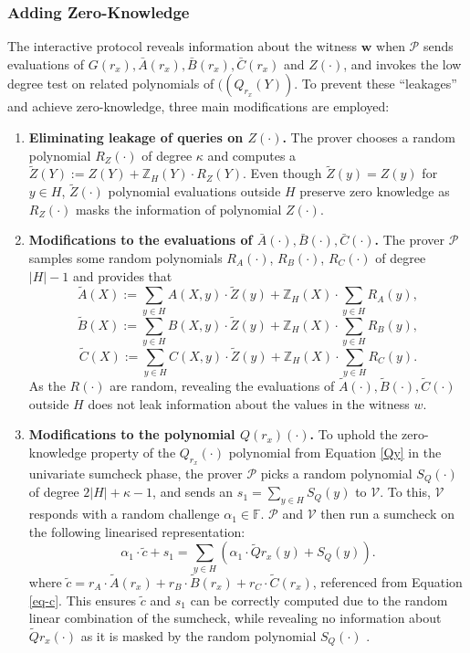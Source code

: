 \subsubsection{Adding Zero-Knowledge}\label{zkpolaris}
The interactive protocol reveals information about the witness $\textbf{w}$ when $\mathcal{P}$ sends evaluations of $G(r_x), \bar{A}(r_x), \bar{B}(r_x), \bar{C}(r_x)$ and $Z(\cdot)$, and invokes the low degree test on related polynomials of $((Q_{r_x}(Y))$. To prevent these ``leakages'' and achieve zero-knowledge, three main modifications are employed:
\begin{enumerate}
	\item \textbf{Eliminating leakage of queries on $Z(\cdot)$.} The prover chooses a random polynomial $R_Z(\cdot)$ of degree $\kappa$ and computes a $\widetilde{Z}(Y):= Z(Y)+\mathbb{Z}_{H}(Y)\cdot R_Z(Y)$. Even though $\widetilde{Z}(y)=Z(y)$ for $y\in H$, $\widetilde{Z}(\cdot)$ polynomial evaluations outside $H$ preserve zero knowledge as $R_Z(\cdot)$ masks the information of polynomial $Z(\cdot)$. 
	\item \textbf{Modifications to the evaluations of $\bar{A}(\cdot), \bar{B}(\cdot), \bar{C}(\cdot)$.} The prover $\mathcal{P}$ samples some random polynomials $R_A(\cdot)$, $R_B(\cdot)$, $R_C(\cdot)$ of degree $|H|-1$ and provides that
	$$\widetilde{A}(X)  := \sum_{y\in H}A(X,y)\cdot\widetilde{Z}(y)+\mathbb{Z}_{H}(X)\cdot\sum_{y\in H}R_A(y),$$
	$$\widetilde{B}(X)  := \sum_{y\in H}B(X,y)\cdot\widetilde{Z}(y)+\mathbb{Z}_{H}(X)\cdot\sum_{y\in H}R_B(y),$$
	$$\widetilde{C}(X)  := \sum_{y\in H}C(X,y)\cdot\widetilde{Z}(y)+\mathbb{Z}_{H}(X)\cdot\sum_{y\in H}R_C(y).$$
	As the $R(\cdot)$ are random, revealing the evaluations of $\widetilde{A}(\cdot), \widetilde{B}(\cdot), \widetilde{C}(\cdot)$ outside $H$ does not leak information about the values in the witness $w$.
	\item \textbf{Modifications to the polynomial $Q(r_x)(\cdot)$.}
	To uphold the zero-knowledge property of the $Q_{r_x}(\cdot)$ polynomial from Equation \eqref{Qy} in the univariate sumcheck phase, the prover $\mathcal{P}$ picks a random polynomial $S_Q(\cdot)$ of degree $2|H|+\kappa-1$, and sends an $s_1=\sum_{y\in H}S_Q(y)$ to $\mathcal{V}$. To this, $\mathcal{V}$ responds with a random challenge $\alpha_1 \in \mathbb{F}$. $\mathcal{P}$ and $\mathcal{V}$ then run a sumcheck on the following linearised representation:
	\[
	\alpha_1\cdot \widetilde{c}+s_1=\sum_{y\in H}(\alpha_1\cdot\widetilde{Q}{r_x}(y)+S_Q(y)).
	\]
	where $\widetilde{c}=r_A\cdot\widetilde{A}(r_x)+r_B\cdot\widetilde{B}(r_x)+r_C\cdot\widetilde{C}(r_x)$, referenced from Equation \eqref{eq-c}.  
	This ensures $\widetilde{c}$ and $s_1$ can be correctly computed due to the random linear combination of the sumcheck, while revealing no information about $\widetilde{Q}{r_x}(\cdot)$ as it is masked by the random polynomial $S_Q(\cdot)$ \cite{aurora}\cite{zhang2020transparent} .
\end{enumerate}

